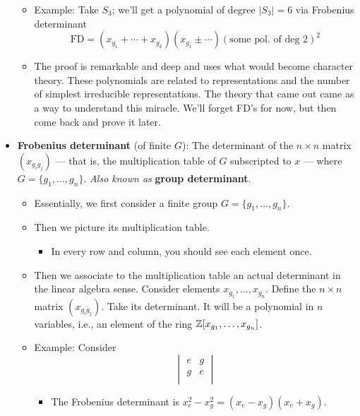 \documentclass[../notes.tex]{subfiles}
\begin{document}
\begin{itemize}
\begin{itemize}
        \item Example: Take $S_3$; we'll get a polynomial of degree $|S_3|=6$ via Frobenius determinant
        \begin{equation*}
            \text{FD} = (x_{g_1}+\cdots+x_{g_k})(x_{g_1}\pm\cdots)(\text{some pol. of deg 2})^2
        \end{equation*}
        \item The proof is remarkable and deep and uses what would become character theory. These polynomials are related to representations and the number of simplest irreducible representations. The theory that came out came as a way to understand this miracle. We'll forget FD's for now, but then come back and prove it later.
    \end{itemize}
    \item \textbf{Frobenius determinant} (of finite $G$): The determinant of the $n\times n$ matrix $(x_{g_ig_j})$ --- that is, the multiplication table of $G$ subscripted to $x$ --- where $G=\{g_1,\dots,g_n\}$. \emph{Also known as} \textbf{group determinant}.
    \begin{itemize}
        \item Essentially, we first consider a finite group $G=\{g_1,\dots,g_n\}$.
        \item Then we picture its multiplication table.
        \begin{itemize}
            \item In every row and column, you should see each element once.
        \end{itemize}
        \item Then we associate to the multiplication table an actual determinant in the linear algebra sense. Consider elements $x_{g_1},\dots,x_{g_n}$. Define the $n\times n$ matrix $(x_{g_ig_j})$. Take its determinant. It will be a polynomial in $n$ variables, i.e., an element of the ring $\mathbb{Z}[x_{g_1},\dots,x_{g_n}]$.
        \item Example: Consider
        \begin{equation*}
            \begin{vmatrix}
                e & g\\
                g & e\\
            \end{vmatrix}
        \end{equation*}
        \begin{itemize}
            \item The Frobenius determinant is $x_e^2-x_g^2=(x_e-x_g)(x_e+x_g)$.

\end{itemize}
\end{itemize}
\end{itemize}
\end{document}
